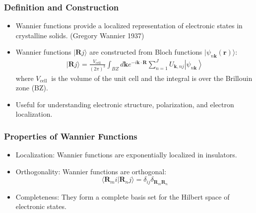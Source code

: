 \documentclass{CustomBeamer}
\begin{document}
    \begin{frame}
    \frametitle{Definition and Construction}
    \begin{itemize}
        \item Wannier functions provide a localized representation of electronic states in crystalline solids. (Gregory Wannier 1937)
        \item Wannier functions $|\mathbf{R} j\rangle$ are constructed from Bloch functions $|\psi_{n\mathbf{k}}(\mathbf{r})\rangle$:
        \begin{align}
            |\mathbf{R} j\rangle=\frac{V_{\text {cell }}}{(2 \pi)^3} \int_{B Z} d \mathbf{k} e^{-i \mathbf{k} \cdot \mathbf{R}} \sum_{n=1}^J U_{\mathbf{k}, n j}\left|\psi_{n \mathbf{k}}\right\rangle
            \end{align}
        where $V_{\text {cell }}$ is the volume of the unit cell and the integral is over the Brillouin zone (BZ).
        \item Useful for understanding electronic structure, polarization, and electron localization.
    \end{itemize}
    \end{frame}
    
    \begin{frame}
    \frametitle{Properties of Wannier Functions}
    \begin{itemize}
        \item Localization: Wannier functions are exponentially localized in insulators.
        \item Orthogonality: Wannier functions are orthogonal:
        \begin{equation}
        \langle \mathbf{R}_m i| \mathbf{R}_n j \rangle = \delta_{ij} \delta_{\mathbf{R}_m \mathbf{R}_n}
        \end{equation}
        \item Completeness: They form a complete basis set for the Hilbert space of electronic states.
    \end{itemize}
    \end{frame}
    
\end{document}
